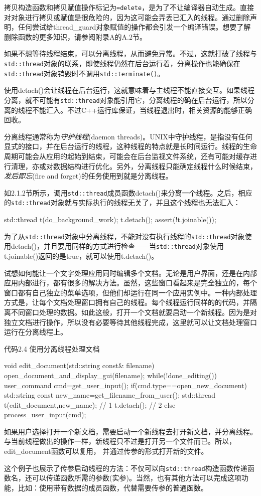 拷贝构造函数和拷贝赋值操作标记为\texttt{=delete}，是为了不让编译器自动生成。直接对对象进行拷贝或赋值是很危险的，因为这可能会弄丢已汇入的线程。通过删除声明，任何尝试给thread\_guard对象赋值的操作都会引发一个编译错误。想要了解删除函数的更多知识，请参阅附录A的A.2节。

如果不想等待线程结束，可以分离线程，从而避免异常。不过，这就打破了线程与\texttt{std::thread}对象的联系，即使线程仍然在后台运行着，分离操作也能确保在\texttt{std::thread}对象销毁时不调用\texttt{std::terminate()}。


使用detach()会让线程在后台运行，这就意味着与主线程不能直接交互。如果线程分离，就不可能有\texttt{std::thread}对象能引用它，分离线程的确在后台运行，所以分离的线程不能汇入。不过C++运行库保证，当线程退出时，相关资源的能够正确回收。

分离线程通常称为\textit{守护线程}(daemon threads)。UNIX中守护线程，是指没有任何显式的接口，并在后台运行的线程，这种线程的特点就是长时间运行。线程的生命周期可能会从应用的起始到结束，可能会在后台监视文件系统，还有可能对缓存进行清理，亦或对数据结构进行优化。另外，分离线程只能确定线程什么时候结束，\textit{发后即忘}(fire and forget)的任务使用到就是分离线程。

如2.1.2节所示，调用\texttt{std::thread}成员函数detach()来分离一个线程。之后，相应的\texttt{std::thread}对象就与实际执行的线程无关了，并且这个线程也无法汇入：

\begin{cpp}
std::thread t(do_background_work);
t.detach();
assert(!t.joinable());
\end{cpp}

为了从\texttt{std::thread}对象中分离线程，不能对没有执行线程的\texttt{std::thread}对象使用detach()，并且要用同样的方式进行检查——当\texttt{std::thread}对象使用t.joinable()返回的是true，就可以使用t.detach()。

试想如何能让一个文字处理应用同时编辑多个文档。无论是用户界面，还是在内部应用内部进行，都有很多的解决方法。虽然，这些窗口看起来是完全独立的，每个窗口都有自己独立的菜单选项，但他们却运行在同一个应用实例中。一种内部处理方式是，让每个文档处理窗口拥有自己的线程。每个线程运行同样的的代码，并隔离不同窗口处理的数据。如此这般，打开一个文档就要启动一个新线程。因为是对独立文档进行操作，所以没有必要等待其他线程完成，这里就可以让文档处理窗口运行在分离线程上。

代码2.4 使用分离线程处理文档

\begin{cpp}
void edit_document(std::string const& filename)
{
  open_document_and_display_gui(filename);
  while(!done_editing())
  {
    user_command cmd=get_user_input();
    if(cmd.type==open_new_document)
    {
      std::string const new_name=get_filename_from_user();
      std::thread t(edit_document,new_name);  // 1
      t.detach();  // 2
    }
    else
    {
       process_user_input(cmd);
    }
  }
}
\end{cpp}


如果用户选择打开一个新文档，需要启动一个新线程去打开新文档，并分离线程。与当前线程做出的操作一样，新线程只不过是打开另一个文件而已。所以，edit\_document函数可以复用， 并通过传参的形式打开新的文件。

这个例子也展示了传参启动线程的方法：不仅可以向\texttt{std::thread}构造函数传递函数名，还可以传递函数所需的参数(实参)。当然，也有其他方法可以完成这项功能，比如：使用带有数据的成员函数，代替需要传参的普通函数。

